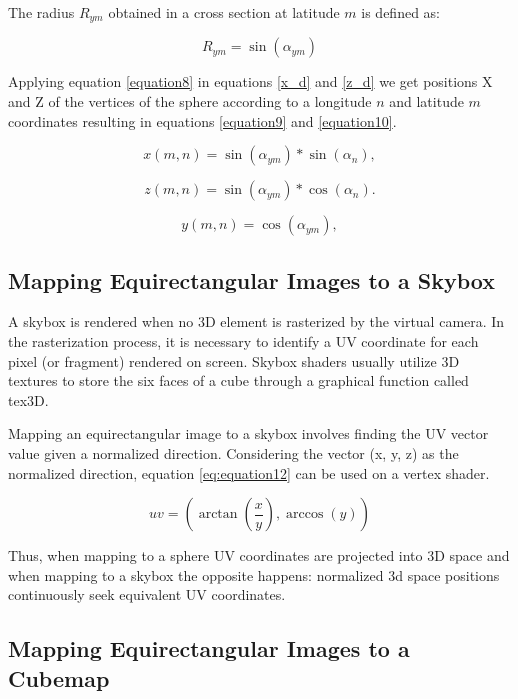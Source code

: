 \documentclass[10pt,conference,pdftex]{IEEEtran}
\begin{document}
The radius $R_{ym}$ obtained in a cross section at latitude $m$ is defined as:

\begin{equation}
R_{ym} = \sin(\alpha_{ym})
\label{equation8}
\end{equation}

Applying equation \ref{equation8} in equations \ref{x_d} and \ref{z_d} we get positions X and Z of the vertices of the sphere according to a longitude $n$ and latitude $m$ coordinates resulting in equations \ref{equation9} and \ref{equation10}.

\begin{equation}
x(m,n) = \sin(\alpha_{ym}) * \sin(\alpha_n),
\label{equation9}
\end{equation}

\begin{equation}
z(m,n) = \sin(\alpha_{ym}) * \cos(\alpha_n).
\label{equation10}
\end{equation}

\begin{equation}
y(m,n) = \cos(\alpha_{ym}),
\label{equation11}
\end{equation}

\subsection{Mapping Equirectangular Images to a Skybox}

A skybox is rendered when no 3D element is rasterized by the virtual camera. In the rasterization process, it is necessary to identify a UV coordinate for each pixel (or fragment) rendered on screen. Skybox shaders usually utilize 3D textures to store the six faces of a cube through a graphical function called tex3D.

Mapping an equirectangular image to a skybox involves finding the UV vector value given a normalized direction. Considering the vector (x, y, z) as the normalized direction, equation \ref{eq:equation12} can be used on a vertex shader.

\begin{equation}
    uv = (\arctan{(\frac{x}{y})},\arccos{(y)})
    \label{eq:equation12}
\end{equation}

Thus, when mapping to a sphere UV coordinates are projected into 3D space and when mapping to a skybox the opposite happens: normalized 3d space positions continuously seek equivalent UV coordinates.


\subsection{ Mapping Equirectangular Images to a Cubemap} \label{subsec:equiconvtocubemap}
\end{document}
